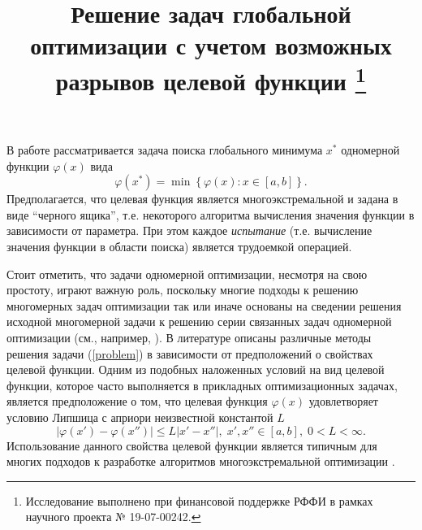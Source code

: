 \documentclass[11pt, oneside, a4paper]{article}
\begin{document}
\setcounter{page}{1}



\title{
Решение задач глобальной оптимизации с учетом возможных разрывов целевой функции
\footnote{Исследование выполнено при финансовой поддержке РФФИ в рамках научного проекта № 19-07-00242.}
}





\bigskip

В работе рассматривается задача поиска глобального минимума $x^*$ одномерной функции $\varphi(x)$ вида
\begin{equation}\label{problem}
\varphi(x^*)=\min\left\{\varphi(x):x\in\left[a,b\right]\right\}.
\end{equation}
Предполагается, что целевая функция является многоэкстремальной и задана в виде ``черного ящика'', т.е. некоторого алгоритма вычисления значения функции в зависимости от параметра. При этом каждое \textit{испытание} (т.е. вычисление значения функции в области поиска) является трудоемкой операцией.  

Стоит отметить, что задачи одномерной оптимизации, несмотря на свою простоту, играют важную роль, поскольку многие подходы к решению многомерных задач оптимизации так или иначе основаны на сведении решения исходной многомерной задачи к решению серии связанных задач одномерной оптимизации (см., например, \cite{Grishagin2007,Sergeyev2008}).
В литературе описаны различные методы решения задачи (\ref{problem}) в зависимости от предположений о свойствах целевой функции. Одним из подобных наложенных условий на вид целевой функции, которое часто выполняется в прикладных оптимизационных задачах, является предположение о том, что целевая функция $\varphi(x)$ удовлетворяет условию Липшица с априори неизвестной константой $L$
\[
\left|\varphi(x')-\varphi(x'')\right|\leq L\left|x'-x''\right|,\; x',x'' \in [a,b],\; 0<L<\infty.
\]
Использование данного свойства целевой функции является типичным для многих подходов к разработке алгоритмов многоэкстремальной оптимизации \cite{Evtushenko2009,Elsakov}. 
\end{document}
